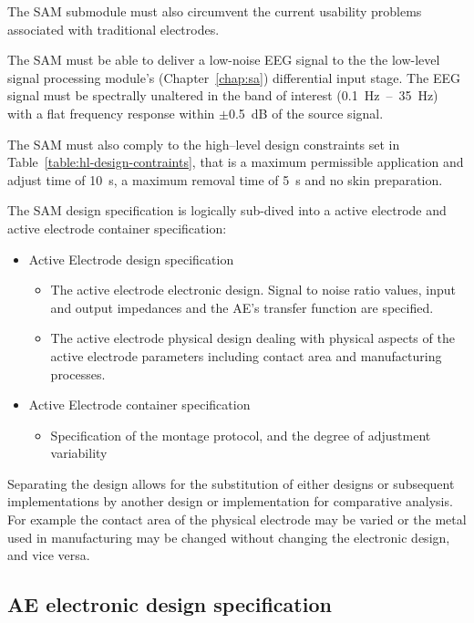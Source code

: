 The SAM submodule must also circumvent the current usability problems
associated with traditional electrodes.


The SAM must be able to deliver a low-noise EEG signal to the the
low-level signal processing module's (Chapter~\vref{chap:sa})
differential input stage. The EEG signal must be spectrally unaltered
in the band of interest (0.1~Hz~--~35~Hz) with a flat frequency
response within $\pm$0.5~dB of the source signal.


The SAM must also comply to the high--level design constraints set in
Table~\vref{table:hl-design-contraints}, that is a maximum permissible
application and adjust time of 10~s, a maximum removal time of 5~s and
no skin preparation.

The SAM design specification is logically sub-dived into a active
electrode and active electrode container specification:
\begin{itemize}
	\item{Active Electrode design specification} 
		\begin{itemize} 

			\item{The active electrode electronic design. Signal to
			noise ratio values, input and output impedances and the
			AE's transfer function are specified.}

			\item{The active electrode physical design dealing with
			physical aspects of the active electrode parameters including
			contact area and manufacturing processes.}

		\end{itemize}
	\item{Active Electrode container specification}
	
		\begin{itemize}
			\item{Specification of the montage protocol, and the degree of
			adjustment variability}
		\end{itemize}
\end{itemize}


Separating the design allows for the substitution of either designs or
subsequent implementations by another design or implementation for
comparative analysis. For example the contact area of the physical
electrode may be varied or the metal used in manufacturing may be
changed without changing the electronic design, and vice versa.


\subsection{AE electronic design specification}

